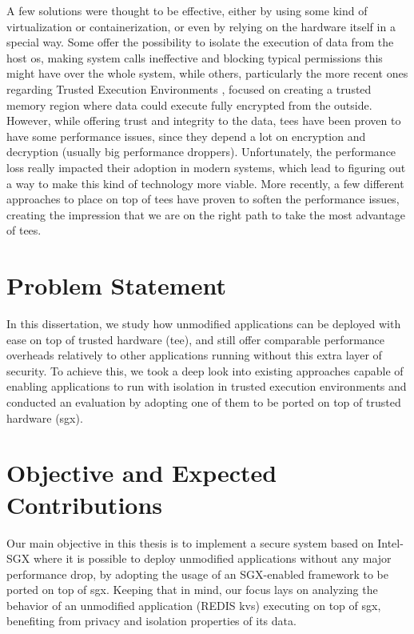 A few solutions were thought to be effective, either by using some kind of virtualization or containerization, or even by relying on the hardware itself in a special way. 
Some \cite{virtGhostPaper}\cite{flickerPaper}\cite{mushiPaper}\cite{SeCagePaper}\cite{inkTagPaper}\cite{segoPaper} offer the possibility to isolate the execution of data from the host \gls{os}, making system calls ineffective and blocking typical permissions this might have over the whole system, while others, particularly the more recent ones regarding Trusted Execution Environments \cite{armTZPaper}\cite{amdPaper}\cite{sanctumPaper}\cite{intelSGX}, focused on creating a trusted memory region where data could execute fully encrypted from the outside. 
However, while offering trust and integrity to the data, \gls{tee}s have been proven to have some performance issues, since they depend a lot on encryption and decryption (usually big performance droppers). Unfortunately, the performance loss really impacted their adoption in modern systems, which lead to figuring out a way to make this kind of technology more viable. 
More recently, a few different approaches to place on top of \gls{tee}s have proven to soften the performance issues, creating the impression that we are on the right path to take the most advantage of \gls{tee}s. 


\section{Problem Statement}

In this dissertation, we study how unmodified applications can be deployed with ease on top of trusted hardware (\gls{tee}), and still offer comparable performance overheads relatively to other applications running without this extra layer of security. To achieve this, we took a deep look into existing approaches capable of enabling applications to run with isolation in trusted execution environments and conducted an evaluation by adopting one of them to be ported on top of trusted hardware (\gls{sgx}). 


\section{Objective and Expected Contributions} %
\label{sec:objectiveAndContibutions}
Our main objective in this thesis is to implement a secure system based on Intel-SGX
where it is possible to deploy unmodified applications without any major performance
drop, by adopting the usage of an SGX-enabled framework to be ported on top of \gls{sgx}. Keeping that in mind, our focus lays on analyzing the behavior of an unmodified application (REDIS \gls{kvs}) executing on top of \gls{sgx}, benefiting from privacy and isolation properties of its data.

